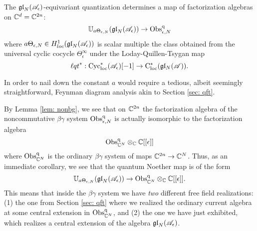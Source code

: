 \begin{prop}
The ${\mathfrak{gl}}_N(\mathscr A_\epsilon)$-equivariant quantization determines a map of factorization algebras on $\mathbb C^d = \mathbb C^{2n}$: 
\[
\mathbb U_{a \Theta_{\epsilon, N}} ({\mathfrak{gl}}_N(\mathscr A_\epsilon)) \to {\rm Obs}^{\rm q}_{\epsilon, N}
\]
where $a \Theta_{\epsilon, N} \in H^1_{loc}({\mathfrak{gl}}_N(\mathscr A_{\epsilon}))$ is scalar multiple the class obtained from the universal cyclic cocycle $\Theta_{\epsilon}^\infty$ under the Loday-Quillen-Tsygan map
\[
{\ell q t}^* : {\rm Cyc}_{\rm loc}^*(\mathscr A_\epsilon)[-1] \to {\rm C}_{\rm loc}^*(\mathfrak{g} \mathfrak{l}_N( \mathscr A))  .
\]
\end{prop}

\begin{rmk}
In order to nail down the constant $a$ would require a tedious, albeit seemingly straightforward, Feynman diagram analysis akin to Section \ref{sec: qft}. 
\end{rmk}

By Lemma \ref{lem: nonbg}, we see that on $\mathbb C^{2n}$ the factorization algebra of the noncommutative $\beta\gamma$ system ${\rm Obs}^{\rm q}_{\epsilon, N}$ is actually isomorphic to the factorization algebra
\[
{\rm Obs}^{\rm q}_{\mathbb C^{N}} \otimes_{\mathbb C} \mathbb C[[\epsilon]]
\]
where ${\rm Obs}^{\rm q}_{\mathbb C^{N}}$ is the ordinary $\beta\gamma$ system of maps $\mathbb C^{2n} \to \mathbb C^N$. 
Thus, as an immediate corollary, we see that the quantum Noether map is of the form
\[
\mathbb U_{a \Theta_{\epsilon, N}} ({\mathfrak{gl}}_N(\mathscr A_\epsilon)) \to {\rm Obs}^{\rm q}_{\mathbb C^{N}} \otimes_{\mathbb C} \mathbb C[[\epsilon]] .
\]
This means that inside the $\beta\gamma$ system we have {\em two} different free field realizations: (1) the one from Section \ref{sec: qft} where we realized the ordinary current algebra at some central extension in ${\rm Obs}^{\rm q}_{\mathbb C^{N}}$, and (2) the one we have just exhibited, which realizes a central extension of the algebra ${\mathfrak{gl}}_N(\mathscr A_{\epsilon})$. 
